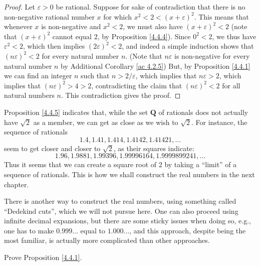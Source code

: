 \begin{proof}
Let \(\varepsilon > 0\) be rational.
Suppose for sake of contradiction that there is no non-negative rational number \(x\) for which \(x^2 < 2 < (x + \varepsilon)^2\).
This means that whenever \(x\) is non-negative and \(x^2 < 2\), we must also have \((x + \varepsilon)^2 < 2\)
(note that \((x + \varepsilon)^2\) cannot equal \(2\), by Proposition \ref{4.4.4}).
Since \(0^2 < 2\), we thus have \(\varepsilon^2 < 2\), which then implies \((2\varepsilon)^2 < 2\), and indeed a simple induction shows that \((n\varepsilon)^2 < 2\) for every natural number \(n\).
(Note that \(n\varepsilon\) is non-negative for every natural number \(n\) by Additional Corollary \ref{ac 4.2.5})
But, by Proposition \ref{4.4.1} we can find an integer \(n\) such that \(n > 2 / \varepsilon\), which implies that \(n\varepsilon > 2\), which implies that \((n\varepsilon)^2 > 4 > 2\), contradicting the claim that \((n\varepsilon)^2 < 2\) for all natural numbers \(n\).
This contradiction gives the proof.
\end{proof}

\begin{note}
Proposition \ref{4.4.5} indicates that, while the set \(\mathbf{Q}\) of rationals does not actually have \(\sqrt{2}\) as a member, we can get as close as we wish to \(\sqrt{2}\).
For instance, the sequence of rationals
\[
    1.4, 1.41, 1.414, 1.4142, 1.41421, \dots
\]
seem to get closer and closer to \(\sqrt{2}\), as their squares indicate:
\[
    1.96, 1.9881, 1.99396, 1.99996164, 1.9999899241, \dots
\]
Thus it seems that we can create a square root of \(2\) by taking a ``limit'' of a sequence of rationals.
This is how we shall construct the real numbers in the next chapter.
\end{note}

\begin{note}
There is another way to construct the real numbers, using something called ``Dedekind cuts'', which we will not pursue here.
One can also proceed using infinite decimal expansions, but there are some sticky issues when doing so, e.g., one has to make \(0.999\dots\) equal to \(1.000\dots\), and this approach, despite being the most familiar, is actually more complicated than other approaches.
\end{note}

\exercisesection

\begin{exercise}\label{ex 4.4.1}
Prove Proposition \ref{4.4.1}.
\end{exercise}

